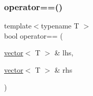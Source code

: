 \mbox{\label{vector_8inl_a7c456a6a390a779890d09b7eb9fc9f47}} 
\subsubsection{\texorpdfstring{operator==()}{operator==()}}
{\footnotesize\ttfamily template$<$typename T $>$ \\
bool operator== (\begin{DoxyParamCaption}\item[{\hyperlink{classsc_1_1vector}{vector}$<$ T $>$ \&}]{lhs,  }\item[{\hyperlink{classsc_1_1vector}{vector}$<$ T $>$ \&}]{rhs }\end{DoxyParamCaption})}

